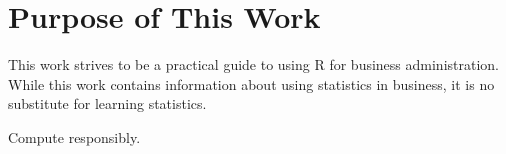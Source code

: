 %
%
%
%
%

\section{Purpose of This Work}

This work strives to be a practical guide to using R for business 
administration. While this work contains information about using statistics in business, it is no substitute for learning statistics.

Compute responsibly.